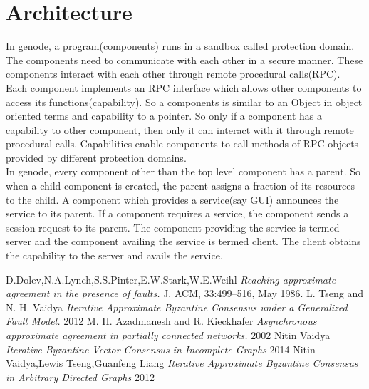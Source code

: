 \documentclass[12pt]{article}
\theoremstyle{plain}
\begin{document}
\section*{Architecture}
In genode, a program(components) runs in a sandbox called protection domain. The components need to communicate with each other in a secure manner. These components interact with each other through remote procedural calls(RPC). Each component implements an RPC interface which allows other components to access its functions(capability). So a components is similar to an Object in object oriented terms and capability to a pointer. So only if a component has a capability to other component, then only it can interact with it through remote procedural calls. Capabilities enable components to call methods of RPC objects provided by different
protection domains.
\\
In genode, every component other than the top level component has a parent. So when a child component is created, the parent assigns a fraction of its resources to the child. A component which provides a service(say GUI) announces the service to its parent. If a component requires a service, the component sends a session request to its parent. The component providing the service is termed server and the component availing the service is termed client. The client obtains the capability to the server and avails the service.
\newpage
\begin{thebibliography}{9}

  D.Dolev,N.A.Lynch,S.S.Pinter,E.W.Stark,W.E.Weihl
  \emph{Reaching approximate agreement in the presence of faults.}
  J. ACM, 33:499–516, May 1986.
  L. Tseng and N. H. Vaidya
  \emph{Iterative Approximate
Byzantine Consensus under a Generalized Fault
Model.}
  2012
  M. H. Azadmanesh and R. Kieckhafer
  \emph{Asynchronous
approximate agreement in partially connected
networks.}
  2002
  Nitin Vaidya
  \emph{Iterative Byzantine Vector Consensus in Incomplete Graphs}
  2014
  Nitin Vaidya,Lewis Tseng,Guanfeng Liang
  \emph{Iterative Approximate Byzantine Consensus
in Arbitrary Directed Graphs}
  2012
\end{thebibliography}
\end{document}
